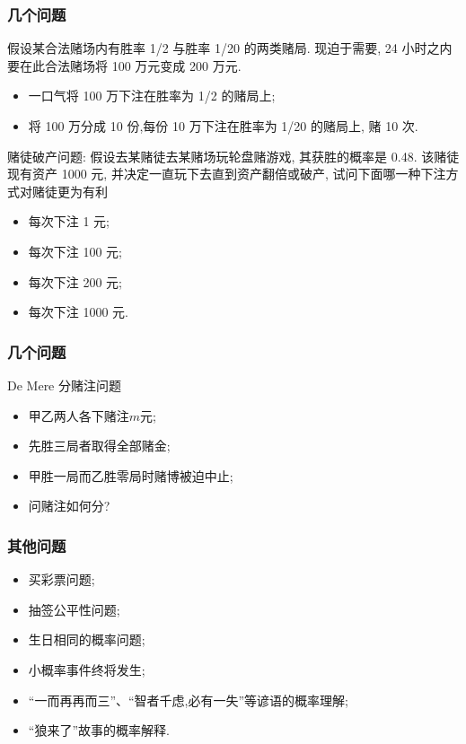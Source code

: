 \begin{frame}
	\frametitle{几个问题}

	\begin{prob}
		假设某合法赌场内有胜率 1/2 与胜率 1/20 的两类赌局. 现迫于需要, 24 小时之内要在此合法赌场将 100 万元变成 200 万元.
		\begin{itemize}[<+-|alert@+>]
			\item  一口气将 100 万下注在胜率为 1/2 的赌局上;

			\item  将 100 万分成 10 份,每份 10 万下注在胜率为 1/20 的赌局上, 赌 10 次.
		\end{itemize}

	\end{prob}
	\pause
	\vspace{0.5cm}
	\begin{prob}
		赌徒破产问题: 假设去某赌徒去某赌场玩轮盘赌游戏, 其获胜的概率是 0.48. 该赌徒现有资产 1000 元, 并决定一直玩下去直到资产翻倍或破产, 试问下面哪一种下注方式对赌徒更为有利
		\begin{itemize}[<+-|alert@+>]
			\item 每次下注 1 元;
			\item 每次下注 100 元;
			\item 每次下注 200 元;
			\item 每次下注 1000 元.
		\end{itemize}
	\end{prob}
\end{frame}



\begin{frame}
	\frametitle{几个问题}


	\begin{prob}  {\rm De Mere} 分赌注问题
		\begin{itemize}[<+-|alert@+>]
			\item 甲乙两人各下赌注$m$元;
			\item 先胜三局者取得全部赌金;
			\item 甲胜一局而乙胜零局时赌博被迫中止;
			\item 问赌注如何分?
		\end{itemize}
	\end{prob}
\end{frame}

\begin{frame}
	\frametitle{其他问题}
	\begin{itemize}[<+-|alert@+>]
		\item 买彩票问题;
		\item 抽签公平性问题;
		\item 生日相同的概率问题;
		\item 小概率事件终将发生;
		\item “一而再再而三”、“智者千虑,必有一失”等谚语的概率理解;
		\item “狼来了”故事的概率解释.
	\end{itemize}

\end{frame}


